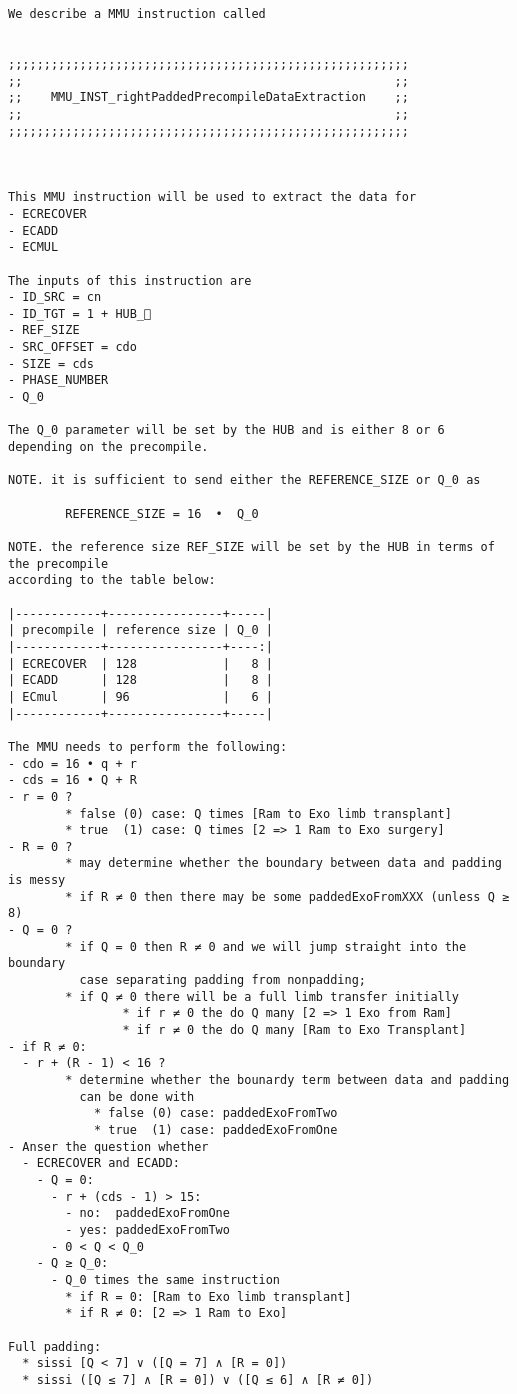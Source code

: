 \documentclass[varwidth=\maxdimen,margin=0.5cm,multi={verbatim}]{standalone}
\begin{document}
\begin{verbatim}
We describe a MMU instruction called 


;;;;;;;;;;;;;;;;;;;;;;;;;;;;;;;;;;;;;;;;;;;;;;;;;;;;;;;;
;;                                                    ;;
;;    MMU_INST_rightPaddedPrecompileDataExtraction    ;;
;;                                                    ;;
;;;;;;;;;;;;;;;;;;;;;;;;;;;;;;;;;;;;;;;;;;;;;;;;;;;;;;;;



This MMU instruction will be used to extract the data for
- ECRECOVER
- ECADD
- ECMUL

The inputs of this instruction are
- ID_SRC = cn
- ID_TGT = 1 + HUB_
- REF_SIZE
- SRC_OFFSET = cdo
- SIZE = cds
- PHASE_NUMBER 
- Q_0

The Q_0 parameter will be set by the HUB and is either 8 or 6 depending on the precompile.

NOTE. it is sufficient to send either the REFERENCE_SIZE or Q_0 as
        
        REFERENCE_SIZE = 16  •  Q_0

NOTE. the reference size REF_SIZE will be set by the HUB in terms of the precompile
according to the table below:

|------------+----------------+-----|
| precompile | reference size | Q_0 |
|------------+----------------+----:|
| ECRECOVER  | 128            |   8 |
| ECADD      | 128            |   8 |
| ECmul      | 96             |   6 |
|------------+----------------+-----|

The MMU needs to perform the following:
- cdo = 16 • q + r
- cds = 16 • Q + R
- r = 0 ?
        * false (0) case: Q times [Ram to Exo limb transplant] 
        * true  (1) case: Q times [2 => 1 Ram to Exo surgery] 
- R = 0 ?
        * may determine whether the boundary between data and padding is messy 
        * if R ≠ 0 then there may be some paddedExoFromXXX (unless Q ≥ 8)
- Q = 0 ?
        * if Q = 0 then R ≠ 0 and we will jump straight into the boundary
          case separating padding from nonpadding;
        * if Q ≠ 0 there will be a full limb transfer initially
                * if r ≠ 0 the do Q many [2 => 1 Exo from Ram]
                * if r ≠ 0 the do Q many [Ram to Exo Transplant]
- if R ≠ 0:
  - r + (R - 1) < 16 ?
        * determine whether the bounardy term between data and padding
          can be done with
            * false (0) case: paddedExoFromTwo
            * true  (1) case: paddedExoFromOne
- Anser the question whether
  - ECRECOVER and ECADD:
    - Q = 0:
      - r + (cds - 1) > 15:
        - no:  paddedExoFromOne
        - yes: paddedExoFromTwo
      - 0 < Q < Q_0
    - Q ≥ Q_0:
      - Q_0 times the same instruction
        * if R = 0: [Ram to Exo limb transplant]
        * if R ≠ 0: [2 => 1 Ram to Exo]

Full padding:
  * sissi [Q < 7] ∨ ([Q = 7] ∧ [R = 0])
  * sissi ([Q ≤ 7] ∧ [R = 0]) ∨ ([Q ≤ 6] ∧ [R ≠ 0])
\end{verbatim}
\end{document}
